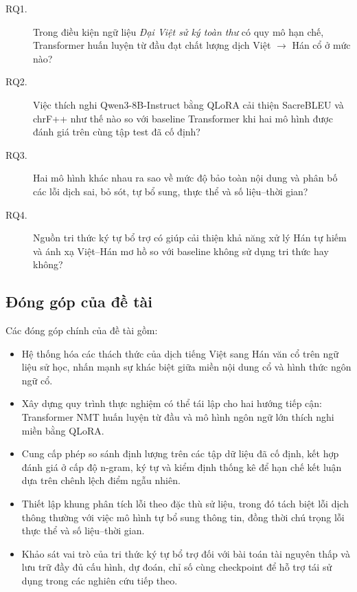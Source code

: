 \begin{description}
    \item[RQ1.] Trong điều kiện ngữ liệu \textit{Đại Việt sử ký toàn thư} có quy mô hạn chế, Transformer huấn luyện từ đầu đạt chất lượng dịch Việt $\rightarrow$ Hán cổ ở mức nào?
    \item[RQ2.] Việc thích nghi Qwen3-8B-Instruct bằng QLoRA cải thiện SacreBLEU và chrF++ như thế nào so với baseline Transformer khi hai mô hình được đánh giá trên cùng tập test đã cố định?
    \item[RQ3.] Hai mô hình khác nhau ra sao về mức độ bảo toàn nội dung và phân bố các lỗi dịch sai, bỏ sót, tự bổ sung, thực thể và số liệu--thời gian?
    \item[RQ4.] Nguồn tri thức ký tự bổ trợ có giúp cải thiện khả năng xử lý Hán tự hiếm và ánh xạ Việt--Hán mơ hồ so với baseline không sử dụng tri thức hay không?
\end{description}

\subsection{Đóng góp của đề tài}

Các đóng góp chính của đề tài gồm:

\begin{itemize}
    \item Hệ thống hóa các thách thức của dịch tiếng Việt sang Hán văn cổ trên ngữ liệu sử học, nhấn mạnh sự khác biệt giữa miền nội dung cổ và hình thức ngôn ngữ cổ.
    \item Xây dựng quy trình thực nghiệm có thể tái lập cho hai hướng tiếp cận: Transformer NMT huấn luyện từ đầu và mô hình ngôn ngữ lớn thích nghi miền bằng QLoRA.
    \item Cung cấp phép so sánh định lượng trên các tập dữ liệu đã cố định, kết hợp đánh giá ở cấp độ n-gram, ký tự và kiểm định thống kê để hạn chế kết luận dựa trên chênh lệch điểm ngẫu nhiên.
    \item Thiết lập khung phân tích lỗi theo đặc thù sử liệu, trong đó tách biệt lỗi dịch thông thường với việc mô hình tự bổ sung thông tin, đồng thời chú trọng lỗi thực thể và số liệu--thời gian.
    \item Khảo sát vai trò của tri thức ký tự bổ trợ đối với bài toán tài nguyên thấp và lưu trữ đầy đủ cấu hình, dự đoán, chỉ số cùng checkpoint để hỗ trợ tái sử dụng trong các nghiên cứu tiếp theo.
\end{itemize}

